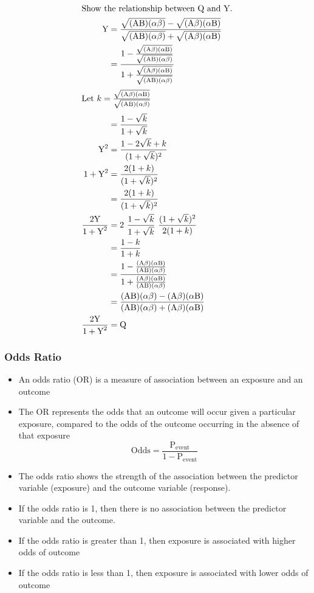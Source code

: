 \documentclass[
10pt, %
a4paper, %
]{report}
\begin{document}
\begin{align*}
\intertext{Show the relationship between Q and Y.}
\text{Y} &= \frac{\sqrt{(\text{AB})(\alpha\beta)} - \sqrt{(\text{A}\beta)(\alpha \text{B})}}{\sqrt{(\text{AB})(\alpha\beta)} + \sqrt{(\text{A}\beta)(\alpha \text{B})}} \\
&= \frac{1 - \frac{\sqrt{(\text{A}\beta)(\alpha \text{B})}}{\sqrt{(\text{AB})(\alpha\beta)}}}{1 + \frac{\sqrt{(\text{A}\beta)(\alpha \text{B})}}{\sqrt{(\text{AB})(\alpha\beta)}}} \\
\intertext{Let \(k = \frac{\sqrt{(\text{A}\beta)(\alpha \text{B})}}{\sqrt{(\text{AB})(\alpha\beta)}}\)}
&= \frac{1-\sqrt{k}}{1+\sqrt{k}} \\
\text{Y}^2 &= \frac{1-2\sqrt{k}+k}{(1+\sqrt{k})^2} \\
1+\text{Y}^2 &= \frac{2(1+k)}{(1+\sqrt{k})^2} \\
&= \frac{2(1+k)}{(1+\sqrt{k})^2} \\
\frac{2\text{Y}}{1+\text{Y}^2} &= 2 \ \frac{1-\sqrt{k}}{1+\sqrt{k}} \ \frac{(1+\sqrt{k})^2}{2(1+k)} \\
&= \frac{1-k}{1+k} \\
&= \frac{1 - \frac{(\text{A}\beta)(\alpha \text{B})}{(\text{AB})(\alpha\beta)}}{1 + \frac{(\text{A}\beta)(\alpha \text{B})}{(\text{AB})(\alpha\beta)}} \\
&= \frac{(\text{AB})(\alpha\beta) - (\text{A}\beta)(\alpha \text{B})}{(\text{AB})(\alpha\beta) + (\text{A}\beta)(\alpha \text{B})} \\
\frac{2\text{Y}}{1+\text{Y}^2} &= \text{Q}
\end{align*}

\subsubsection{Odds Ratio}

\begin{itemize}
\item An odds ratio (OR) is a measure of association between an exposure and an outcome
\item The OR represents the odds that an outcome will occur given a particular exposure, compared to the odds of the outcome occurring in the absence of that exposure
\[\text{Odds} = \frac{\text{P}_\text{event}}{1-\text{P}_\text{event}}\]
\item The odds ratio shows the strength of the association between the predictor variable (exposure) and the outcome variable (response).
\item If the odds ratio is 1, then there is no association between the predictor variable and the outcome.
\item If the odds ratio is greater than 1, then exposure is associated with higher odds of outcome
\item If the odds ratio is less than 1, then exposure is associated with lower odds of outcome
\end{itemize}
\end{document}
